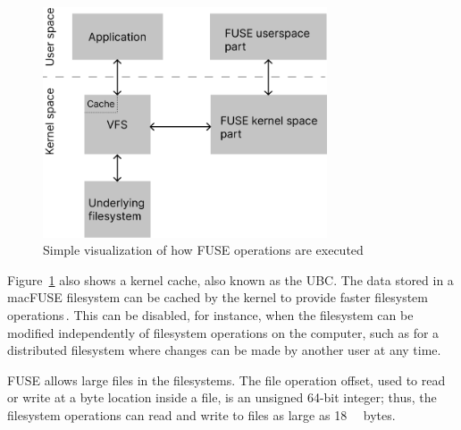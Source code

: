 \begin{figure}[!ht]
	\begin{center}
	  \includegraphics[width=0.75\textwidth]{figures.nosync/fuse_description.png}
	\end{center}
	\caption{Simple visualization of how \gls{FUSE} operations are executed}
	\label{fig:fuse_desc}
\end{figure}

Figure~\ref{fig:fuse_desc} also shows a kernel cache, also known as the \gls{UBC}\cite{silversUBCEfficientUnified2000}. The data stored in a macFUSE filesystem can be cached by the kernel to provide faster filesystem operations\,\cite{vangoorFUSENotFUSE2017, fleischerMountOptionsOsxfuse2020, gowdappaExperiencesFUSEReal2019}. This can be disabled, for instance, when the filesystem can be modified independently of filesystem operations on the computer, such as for a distributed filesystem where changes can be made by another user at any time.

\gls{FUSE} allows large files in the filesystems. The file operation offset, used to read or write at a byte location inside a file, is an unsigned 64-bit integer; thus, the filesystem operations can read and write to files as large as \SI{18}{\exbi\byte} bytes. 